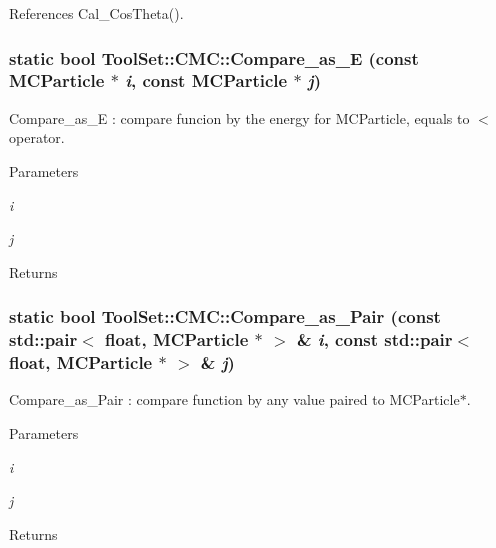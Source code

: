 References Cal\_\-CosTheta().\hypertarget{classToolSet_1_1CMC_a74a827b8a208cbf1ef83ee66b2a9dc04}{
\subsubsection[{Compare\_\-as\_\-E}]{\setlength{\rightskip}{0pt plus 5cm}static bool ToolSet::CMC::Compare\_\-as\_\-E (const MCParticle $\ast$ {\em i}, \/  const MCParticle $\ast$ {\em j})}}
\label{classToolSet_1_1CMC_a74a827b8a208cbf1ef83ee66b2a9dc04}


Compare\_\-as\_\-E : compare funcion by the energy for MCParticle, equals to $<$ operator. 
\begin{DoxyParams}{Parameters}
\item[{\em i}]\item[{\em j}]\end{DoxyParams}
\begin{DoxyReturn}{Returns}

\end{DoxyReturn}
\hypertarget{classToolSet_1_1CMC_a9840196a2fd81836dfc4118e68d7be38}{
\subsubsection[{Compare\_\-as\_\-Pair}]{\setlength{\rightskip}{0pt plus 5cm}static bool ToolSet::CMC::Compare\_\-as\_\-Pair (const std::pair$<$ float, MCParticle $\ast$ $>$ \& {\em i}, \/  const std::pair$<$ float, MCParticle $\ast$ $>$ \& {\em j})}}
\label{classToolSet_1_1CMC_a9840196a2fd81836dfc4118e68d7be38}


Compare\_\-as\_\-Pair : compare function by any value paired to MCParticle$\ast$. 
\begin{DoxyParams}{Parameters}
\item[{\em i}]\item[{\em j}]\end{DoxyParams}
\begin{DoxyReturn}{Returns}

\end{DoxyReturn}


